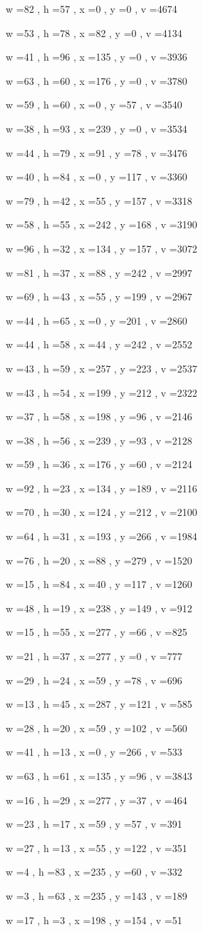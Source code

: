 \documentclass[11pt]{article}
\begin{document}
w =82 , h =57 , x =0 , y =0 , v =4674
\par
w =53 , h =78 , x =82 , y =0 , v =4134
\par
w =41 , h =96 , x =135 , y =0 , v =3936
\par
w =63 , h =60 , x =176 , y =0 , v =3780
\par
w =59 , h =60 , x =0 , y =57 , v =3540
\par
w =38 , h =93 , x =239 , y =0 , v =3534
\par
w =44 , h =79 , x =91 , y =78 , v =3476
\par
w =40 , h =84 , x =0 , y =117 , v =3360
\par
w =79 , h =42 , x =55 , y =157 , v =3318
\par
w =58 , h =55 , x =242 , y =168 , v =3190
\par
w =96 , h =32 , x =134 , y =157 , v =3072
\par
w =81 , h =37 , x =88 , y =242 , v =2997
\par
w =69 , h =43 , x =55 , y =199 , v =2967
\par
w =44 , h =65 , x =0 , y =201 , v =2860
\par
w =44 , h =58 , x =44 , y =242 , v =2552
\par
w =43 , h =59 , x =257 , y =223 , v =2537
\par
w =43 , h =54 , x =199 , y =212 , v =2322
\par
w =37 , h =58 , x =198 , y =96 , v =2146
\par
w =38 , h =56 , x =239 , y =93 , v =2128
\par
w =59 , h =36 , x =176 , y =60 , v =2124
\par
w =92 , h =23 , x =134 , y =189 , v =2116
\par
w =70 , h =30 , x =124 , y =212 , v =2100
\par
w =64 , h =31 , x =193 , y =266 , v =1984
\par
w =76 , h =20 , x =88 , y =279 , v =1520
\par
w =15 , h =84 , x =40 , y =117 , v =1260
\par
w =48 , h =19 , x =238 , y =149 , v =912
\par
w =15 , h =55 , x =277 , y =66 , v =825
\par
w =21 , h =37 , x =277 , y =0 , v =777
\par
w =29 , h =24 , x =59 , y =78 , v =696
\par
w =13 , h =45 , x =287 , y =121 , v =585
\par
w =28 , h =20 , x =59 , y =102 , v =560
\par
w =41 , h =13 , x =0 , y =266 , v =533
\par
w =63 , h =61 , x =135 , y =96 , v =3843
\par
w =16 , h =29 , x =277 , y =37 , v =464
\par
w =23 , h =17 , x =59 , y =57 , v =391
\par
w =27 , h =13 , x =55 , y =122 , v =351
\par
w =4 , h =83 , x =235 , y =60 , v =332
\par
w =3 , h =63 , x =235 , y =143 , v =189
\par
w =17 , h =3 , x =198 , y =154 , v =51
\par
\newpage
\end{document}
